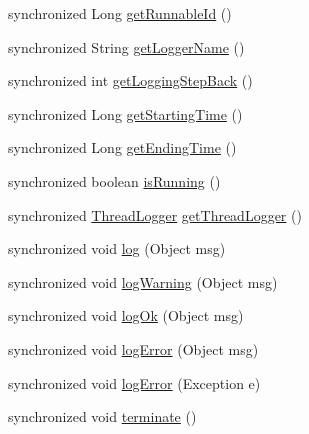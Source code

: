 \begin{DoxyCompactItemize}
\item 
synchronized Long \hyperlink{classit_1_1emarolab_1_1cagg_1_1core_1_1evaluation_1_1CaggThread_ad8f7eb494039924c567f89262639da7f}{get\-Runnable\-Id} ()
\item 
synchronized String \hyperlink{classit_1_1emarolab_1_1cagg_1_1core_1_1evaluation_1_1CaggThread_aebeba1aa75294ada471e7f90ff3e2534}{get\-Logger\-Name} ()
\item 
synchronized int \hyperlink{classit_1_1emarolab_1_1cagg_1_1core_1_1evaluation_1_1CaggThread_a93b270572f26e24415800b9e5e66d3b9}{get\-Logging\-Step\-Back} ()
\item 
synchronized Long \hyperlink{classit_1_1emarolab_1_1cagg_1_1core_1_1evaluation_1_1CaggThread_ace479f46060d9ab0b10ad6184b796b03}{get\-Starting\-Time} ()
\item 
synchronized Long \hyperlink{classit_1_1emarolab_1_1cagg_1_1core_1_1evaluation_1_1CaggThread_a341f6f15ed49be6eada251a4179abac2}{get\-Ending\-Time} ()
\item 
synchronized boolean \hyperlink{classit_1_1emarolab_1_1cagg_1_1core_1_1evaluation_1_1CaggThread_a82639f6dc9dcce587c482a6c53138d9d}{is\-Running} ()
\item 
synchronized \hyperlink{classit_1_1emarolab_1_1cagg_1_1core_1_1evaluation_1_1CaggThread_1_1ThreadLogger}{Thread\-Logger} \hyperlink{classit_1_1emarolab_1_1cagg_1_1core_1_1evaluation_1_1CaggThread_a792ceb33472f28ff58ab116073be3979}{get\-Thread\-Logger} ()
\item 
synchronized void \hyperlink{classit_1_1emarolab_1_1cagg_1_1core_1_1evaluation_1_1CaggThread_aa49ecdc334f44dc2c186c98a02085702}{log} (Object msg)
\item 
synchronized void \hyperlink{classit_1_1emarolab_1_1cagg_1_1core_1_1evaluation_1_1CaggThread_aeee007e4e880968651acb35a2040c49e}{log\-Warning} (Object msg)
\item 
synchronized void \hyperlink{classit_1_1emarolab_1_1cagg_1_1core_1_1evaluation_1_1CaggThread_a585204dfb48ca9df0f17b5bfd58b86c1}{log\-Ok} (Object msg)
\item 
synchronized void \hyperlink{classit_1_1emarolab_1_1cagg_1_1core_1_1evaluation_1_1CaggThread_a7a56cf244147a000e57d9182e2ad1e88}{log\-Error} (Object msg)
\item 
synchronized void \hyperlink{classit_1_1emarolab_1_1cagg_1_1core_1_1evaluation_1_1CaggThread_a5f16a3a6a8834cb1843efc1413adbd1c}{log\-Error} (Exception e)
\item 
synchronized void \hyperlink{classit_1_1emarolab_1_1cagg_1_1core_1_1evaluation_1_1CaggThread_a9b4f7d3d679f2ed806703ff531c3e2e3}{terminate} ()

\end{DoxyCompactItemize}
